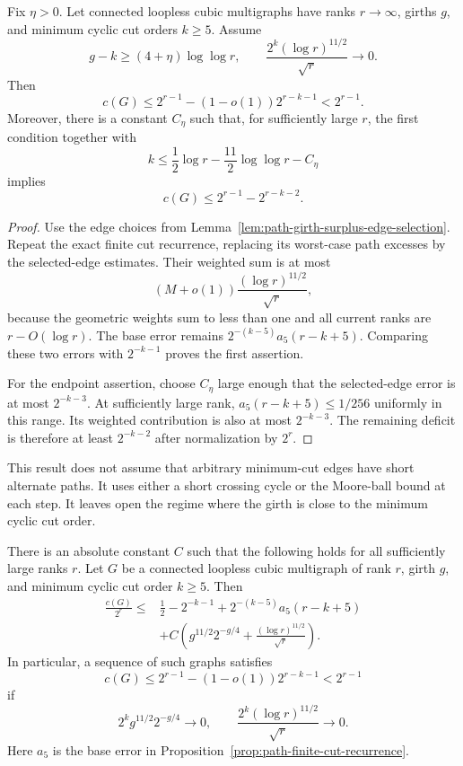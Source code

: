\begin{theorem}
\label{thm:path-girth-surplus-growing-cuts}
Fix $\eta>0$.
Let connected loopless cubic multigraphs have ranks $r\to\infty$, girths $g$, and minimum cyclic cut orders $k\ge5$.
Assume
\[
 g-k\ge(4+\eta)\log\log r,
 \qquad
 \frac{2^k(\log r)^{11/2}}{\sqrt r}\longrightarrow0.
\]
Then
\[
 c(G)\le2^{r-1}-(1-o(1))2^{r-k-1}<2^{r-1}.
\]
Moreover, there is a constant $C_\eta$ such that, for sufficiently large $r$, the first condition together with
\[
 k\le\frac12\log r-\frac{11}{2}\log\log r-C_\eta
\]
implies
\[
 c(G)\le2^{r-1}-2^{r-k-2}.
\]
\end{theorem}

\begin{proof}
Use the edge choices from Lemma~\ref{lem:path-girth-surplus-edge-selection}.
Repeat the exact finite cut recurrence, replacing its worst-case path excesses by the selected-edge estimates.
Their weighted sum is at most
\[
 (M+o(1))\frac{(\log r)^{11/2}}{\sqrt r},
\]
because the geometric weights sum to less than one and all current ranks are $r-O(\log r)$.
The base error remains $2^{-(k-5)}a_5(r-k+5)$.
Comparing these two errors with $2^{-k-1}$ proves the first assertion.

For the endpoint assertion, choose $C_\eta$ large enough that the selected-edge error is at most $2^{-k-3}$.
At sufficiently large rank, $a_5(r-k+5)\le1/256$ uniformly in this range.
Its weighted contribution is also at most $2^{-k-3}$.
The remaining deficit is therefore at least $2^{-k-2}$ after normalization by $2^r$.
\end{proof}

This result does not assume that arbitrary minimum-cut edges have short alternate paths.
It uses either a short crossing cycle or the Moore-ball bound at each step.
It leaves open the regime where the girth is close to the minimum cyclic cut order.

\begin{corollary}
\label{cor:path-girth-weighted-cut-error}
There is an absolute constant $C$ such that the following holds for all sufficiently large ranks $r$.
Let $G$ be a connected loopless cubic multigraph of rank $r$, girth $g$, and minimum cyclic cut order $k\ge5$.
Then
\begin{align*}
 \frac{c(G)}{2^r}
 \le{}&\frac12-2^{-k-1}
 +2^{-(k-5)}a_5(r-k+5)\\
 &+C\left(g^{11/2}2^{-g/4}
       +\frac{(\log r)^{11/2}}{\sqrt r}\right).
\end{align*}
In particular, a sequence of such graphs satisfies
\[
 c(G)\le2^{r-1}-(1-o(1))2^{r-k-1}<2^{r-1}
\]
if
\[
 2^k g^{11/2}2^{-g/4}\longrightarrow0,
 \qquad
 \frac{2^k(\log r)^{11/2}}{\sqrt r}\longrightarrow0.
\]
Here $a_5$ is the base error in Proposition~\ref{prop:path-finite-cut-recurrence}.
\end{corollary}

